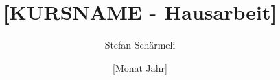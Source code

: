 \documentclass[11pt,paper=a4]{scrreport}
\title{[KURSNAME - Hausarbeit]}
\author{Stefan Schärmeli}
\date{[Monat Jahr]}
\begin{document}
\maketitle
\tableofcontents
\printglossaries
% 
% 
\printbibliography
\listoffigures
\listoftables
\end{document}
